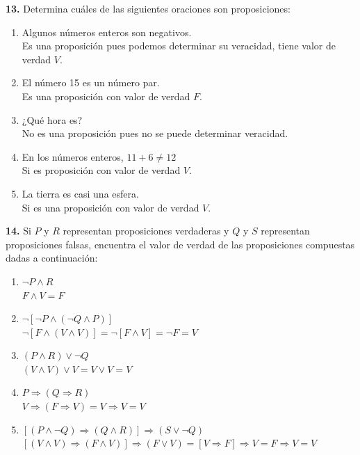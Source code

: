 \documentclass[12pt]{article}
\begin{document}
%
%
\textbf{13.} Determina cuáles de las siguientes oraciones son proposiciones:

\begin{enumerate}[label=\alph*)]
    \item Algunos números enteros son negativos.\\
    Es una proposición pues podemos determinar su veracidad, tiene valor de verdad $V$.
    \item El número 15 es un número par.\\
    Es una proposición con valor de verdad $F$.
    \item ¿Qué hora es?\\
    No es una proposición pues no se puede determinar veracidad.
    \item En los números enteros, $11 + 6 \neq 12$\\
    Si es proposición con valor de verdad $V$.
    \item La tierra es casi una esfera.\\
    Si es una proposición con valor de verdad $V$.
\end{enumerate}

%
%
\textbf{14.} Si $P$ y $R$ representan proposiciones verdaderas y $Q$ y $S$ representan proposiciones falsas,
encuentra el valor de verdad de las proposiciones compuestas dadas a continuación:

\begin{enumerate}[label=\alph*)]
    \item $\neg P \land R$\\
    $F \land V = F$

    \item $\neg [\neg P \land (\neg Q \land P)]$\\
    $\neg[F \land (V \land V)] = \neg[F \land V] = \neg F = V$

    \item $(P \land R) \lor \neg Q$\\
    $(V \land V) \lor V = V \lor V = V$

    \item $P \Longrightarrow (Q \Longrightarrow R)$\\
    $V \Longrightarrow (F \Longrightarrow V) = V \Longrightarrow V = V$

    \item $[(P \land \neg Q) \Longrightarrow (Q \land R)] \Longrightarrow (S \lor \neg Q)$\\
    $[(V \land V) \Longrightarrow (F \land V)] \Longrightarrow (F \lor V) = [V \Longrightarrow F] \Longrightarrow V = F \Longrightarrow V = V$
\end{enumerate}
\end{document}
